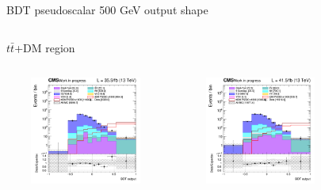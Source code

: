\documentclass[8pt]{beamer}
\begin{document}
\begin{frame}{BDT pseudoscalar 500 GeV output shape}
\vspace{-8pt}
\begin{columns}
\begin{column}{1.09\textwidth}
\begin{block}{\centering $t \bar t$+DM region}\end{block} \vspace{10pt}
\end{column}
\end{columns} \vspace{-16pt}
\begin{columns}
		\begin{column}{0.33\textwidth}
			\begin{center}
     			\includegraphics[width=1.0\textwidth, height=100pt]{figs/2016/SmearSR-ttDM-pseudo500/log_cratio_topCR_ll_TTbar_BDT_output_pseudoscalar500_customBinsAttempt7.png}
    		\end{center}		
		\end{column}
		\begin{column}{0.33\textwidth}
			\begin{center}
     			\includegraphics[width=1.0\textwidth, height=100pt]{figs/2017/SmearSR-ttDM-pseudo500/log_cratio_topCR_ll_TTbar_BDT_output_pseudoscalar500_customBinsAttempt7.png}
    		\end{center}		
		\end{column}
		\begin{column}{0.33\textwidth}
			\begin{center}

\end{center}
\end{column}
\end{columns}
\end{frame}
\end{document}
